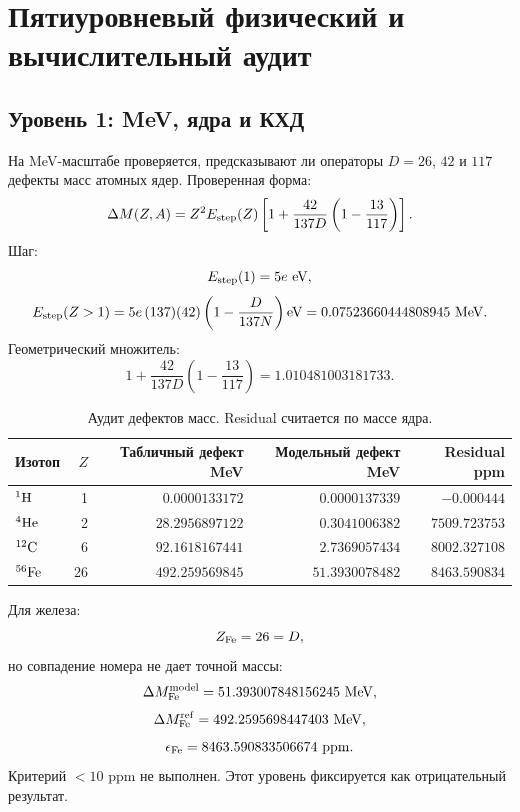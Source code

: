 \documentclass[11pt]{article}
\begin{document}
\section{Пятиуровневый физический и вычислительный аудит}

\subsection{Уровень 1: MeV, ядра и КХД}

На MeV-масштабе проверяется, предсказывают ли операторы $D=26$, $42$ и $117$
дефекты масс атомных ядер.  Проверенная форма:
\begin{equation}
    \Delta M(Z,A)
    =
    Z^2E_{\rm step}(Z)
    \left[
        1+\frac{42}{137D}\left(1-\frac{13}{117}\right)
    \right].
\end{equation}
Шаг:
\begin{equation}
    E_{\rm step}(1)=5e~{\rm eV},
\end{equation}
\begin{equation}
    E_{\rm step}(Z>1)
    =
    5e\,(137)(42)
    \left(1-\frac{D}{137N}\right){\rm eV}
    =
    0.07523660444808945~{\rm MeV}.
\end{equation}
Геометрический множитель:
\begin{equation}
    1+\frac{42}{137D}\left(1-\frac{13}{117}\right)
    =
    1.010481003181733.
\end{equation}

\begin{table}[h]
\centering
\caption{Аудит дефектов масс.  Residual считается по массе ядра.}
\begin{tabular}{lrrrr}
\toprule
Изотоп & $Z$ & Табличный дефект MeV & Модельный дефект MeV & Residual ppm \\
\midrule
$^1{\rm H}$     & 1  & $0.0000133172$ & $0.0000137339$ & $-0.000444$ \\
$^4{\rm He}$    & 2  & $28.2956897122$ & $0.3041006382$ & $7509.723753$ \\
$^{12}{\rm C}$  & 6  & $92.1618167441$ & $2.7369057434$ & $8002.327108$ \\
$^{56}{\rm Fe}$ & 26 & $492.259569845$ & $51.3930078482$ & $8463.590834$ \\
\bottomrule
\end{tabular}
\end{table}

Для железа:
\begin{equation}
    Z_{\rm Fe}=26=D,
\end{equation}
но совпадение номера не дает точной массы:
\begin{equation}
    \Delta M_{\rm Fe}^{\rm model}=51.393007848156245~{\rm MeV},
\end{equation}
\begin{equation}
    \Delta M_{\rm Fe}^{\rm ref}=492.2595698447403~{\rm MeV},
\end{equation}
\begin{equation}
    \epsilon_{\rm Fe}=8463.590833506674~{\rm ppm}.
\end{equation}
Критерий $<10$ ppm не выполнен.  Этот уровень фиксируется как отрицательный
результат.
\end{document}

